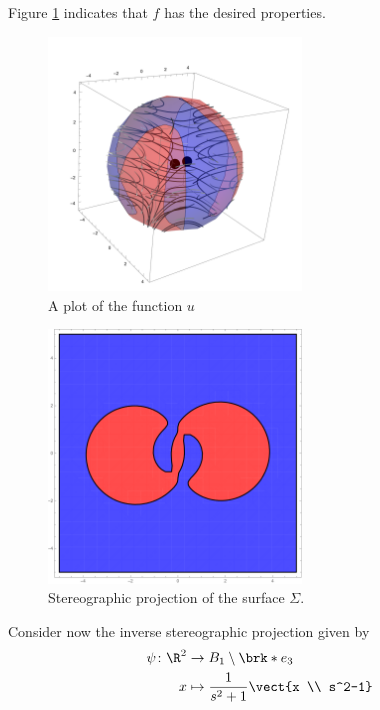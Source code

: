 \begin{example}
  Figure \ref{pl:n3_hf_inflowOutflowStagnationPoint_overview}
  indicates that $f$ has the desired properties.
  \begin{figure}
    \centering
    \includegraphics[width=0.6\textwidth]{../plots/n3_hf_inflowOutflow_Ball_overview.pdf}
    \caption{A plot of the function $u$}
    \label{pl:n3_hf_inflowOutflowStagnationPoint_overview}
  \end{figure}
  \begin{figure} 
    \centering
    \includegraphics[width=0.6\textwidth]{../plots/n3_hf_inflowOutflow_Ball_Surface.pdf}
    \caption{Stereographic projection of the surface $\Sigma$.}
    \label{pl:n3_hf_inflowOutflowStagnationPoint_Surface}
  \end{figure}
  Consider now the inverse stereographic projection given by 
  \begin{align}
    \psi\colon \R^2&\to B_1\setminus\brk*{e_3} \\
    x&\mapsto \frac{1}{s^2+1}\vect{x \\ s^2-1}
  \end{align}

\end{example}
